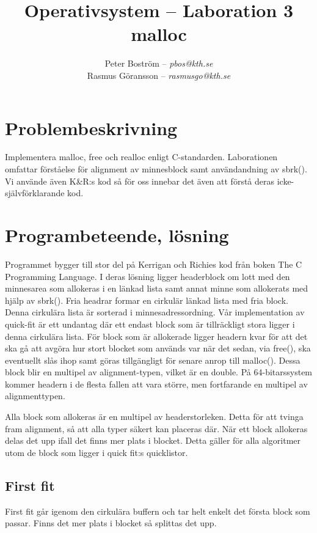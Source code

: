 \documentclass[a4paper,11pt]{article}
\title{Operativsystem -- Laboration 3\\\vspace{4pt}\normalsize malloc}
\author{Peter Boström -- \emph{pbos@kth.se}\\
	Rasmus Göransson -- \emph{rasmusgo@kth.se}}
\begin{document}
\maketitle
\pagestyle{fancyplain}

\section*{Problembeskrivning}

Implementera malloc, free och realloc enligt C-standarden.
Laborationen omfattar förståelse för alignment av minnesblock samt användandning av sbrk().
Vi använde även K\&R:s kod så för oss innebar det även att förstå deras icke-självförklarande kod.

\section*{Programbeteende, lösning}

Programmet bygger till stor del på Kerrigan och Richies kod från boken The C Programming Language. I deras lösning ligger headerblock om lott med den minnesarea som allokeras i en länkad lista samt annat minne som allokerats med hjälp av sbrk().
Fria headrar formar en cirkulär länkad lista med fria block.
Denna cirkulära lista är sorterad i minnesadressordning. Vår implementation av quick-fit är ett undantag där ett endast block som är tillräckligt stora ligger i denna cirkulära lista.
För block som är allokerade ligger headern kvar för att det ska gå att avgöra hur stort blocket som används var när det sedan, via free(), ska eventuellt slås ihop samt göras tillgängligt för senare anrop till malloc().
Dessa block blir en multipel av alignment-typen, vilket är en double.
På 64-bitarssystem kommer headern i de flesta fallen att vara större, men fortfarande en multipel av alignmenttypen.

Alla block som allokeras är en multipel av headerstorleken. Detta för att tvinga fram alignment, så att alla typer säkert kan placeras där. När ett block allokeras delas det upp ifall det finns mer plats i blocket. Detta gäller för alla algoritmer utom de block som ligger i quick fit:s quicklistor.

\subsection*{First fit}

First fit går igenom den cirkulära buffern och tar helt enkelt det första block som passar. Finns det mer plats i blocket så splittas det upp.
\end{document}
